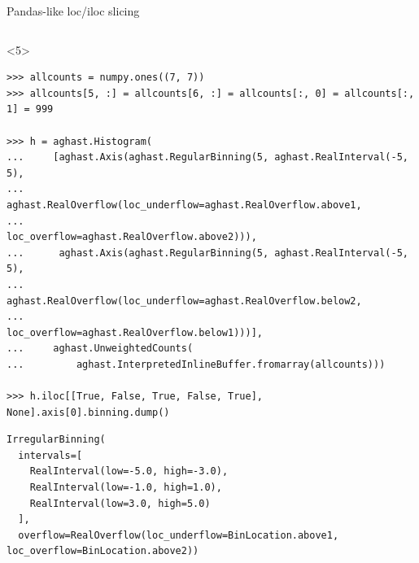 \documentclass[aspectratio=169]{beamer}
\begin{document}
\begin{frame}[fragile]{Pandas-like loc/iloc slicing}
\begin{onlyenv}
\begin{verbatim}
\end{verbatim}
\end{onlyenv}
\begin{onlyenv}<5>
\begin{verbatim}
>>> allcounts = numpy.ones((7, 7))
>>> allcounts[5, :] = allcounts[6, :] = allcounts[:, 0] = allcounts[:, 1] = 999

>>> h = aghast.Histogram(
...     [aghast.Axis(aghast.RegularBinning(5, aghast.RealInterval(-5, 5),
...                  aghast.RealOverflow(loc_underflow=aghast.RealOverflow.above1,
...                                      loc_overflow=aghast.RealOverflow.above2))),
...      aghast.Axis(aghast.RegularBinning(5, aghast.RealInterval(-5, 5),
...                  aghast.RealOverflow(loc_underflow=aghast.RealOverflow.below2,
...                                      loc_overflow=aghast.RealOverflow.below1)))],
...     aghast.UnweightedCounts(
...         aghast.InterpretedInlineBuffer.fromarray(allcounts)))

>>> h.iloc[[True, False, True, False, True], None].axis[0].binning.dump()
\end{verbatim}
\begin{verbatim}
IrregularBinning(
  intervals=[
    RealInterval(low=-5.0, high=-3.0),
    RealInterval(low=-1.0, high=1.0),
    RealInterval(low=3.0, high=5.0)
  ],
  overflow=RealOverflow(loc_underflow=BinLocation.above1, loc_overflow=BinLocation.above2))
\end{verbatim}
\end{onlyenv}






\end{frame}
\end{document}
